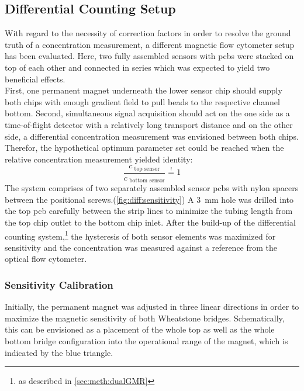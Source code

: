 \clearpage
\subsection{Differential Counting Setup}
\label{sec:res:diffCounting}
With regard to the necessity of correction factors in order to resolve the ground truth of a concentration measurement, a different magnetic flow cytometer setup has been evaluated. Here, two fully assembled sensors with \glspl{pcb} were stacked on top of each other and connected in series which was expected to yield two beneficial effects.\\
First, one permanent magnet underneath the lower sensor chip should supply both chips with enough gradient field to pull beads to the respective channel bottom. Second, simultaneous signal acquisition should act on the one side as a time-of-flight detector with a relatively long transport distance and on the other side, a differential concentration measurement was envisioned between both chips. Therefor, the hypothetical optimum parameter set could be reached when the relative concentration measurement yielded identity:
\begin{equation}
	\dfrac{c_\text{\ top sensor}}{c_\text{\ bottom\ sensor}} \overset{!}{=} 1
	\label{eq:diff:optimum}
\end{equation}
The system comprises of two separately assembled sensor \glspl{pcb} with nylon spacers between the positional screws.(\cref{fig:diff:sensitivity})  A \SI{3}{\milli\meter} hole was drilled into the top \gls{pcb} carefully between the strip lines to minimize the tubing length from the top chip outlet to the bottom chip inlet. 
After the build-up of the differential counting system,\footnote{as described in \cref{sec:meth:dualGMR}} the hysteresis of both sensor elements was maximized for sensitivity and the concentration was measured against a reference from the optical flow cytometer. 

\subsubsection{Sensitivity Calibration}
Initially, the permanent magnet was adjusted in three linear directions in order to maximize the magnetic sensitivity of both Wheatstone bridges. Schematically, this can be envisioned as a placement of the whole top as well as the whole bottom bridge configuration into the operational range of the magnet, which is indicated by the blue triangle.

